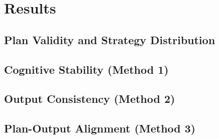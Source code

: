 \chapter{Results}
\label{chap:results}

\section{Plan Validity and Strategy Distribution}
\label{sec:res-validity}

\section{Cognitive Stability (Method 1)}
\label{sec:res-cognitive}

\section{Output Consistency (Method 2)}
\label{sec:res-output}

\section{Plan-Output Alignment (Method 3)}
\label{sec:res-alignment}

